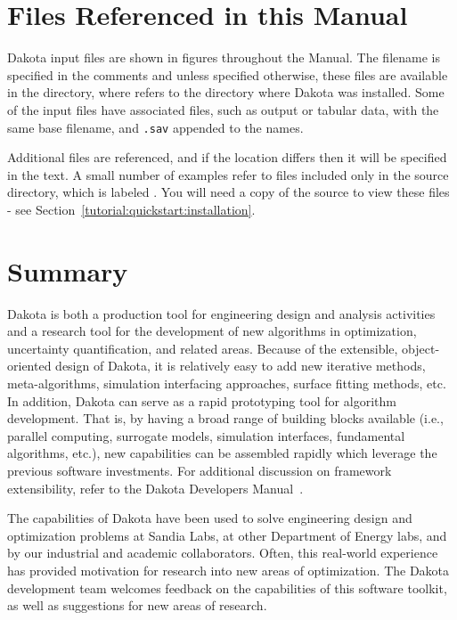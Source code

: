 \section{Files Referenced in this Manual}\label{intro:files}
Dakota input files are shown in figures throughout the Manual. 
The filename is specified in the comments
and unless specified otherwise, these
files are available in the  directory,
where  refers to the directory where Dakota was installed. Some
of the input files have associated files, such as output or tabular data,
with the same base filename, and {\tt .sav} appended to the names.

Additional files are referenced, and if the location differs then it will
be specified in the text.
A small number of examples refer to files included only in the source
directory, which is labeled . You will need a copy of
the source to view these files - see Section~\ref{tutorial:quickstart:installation}.

\section{Summary}\label{intro:summary}

Dakota is both a production tool for engineering design and analysis
activities and a research tool for the development of new algorithms
in optimization, uncertainty quantification, and related areas.
Because of the extensible, object-oriented design of Dakota, it is
relatively easy to add new iterative methods, meta-algorithms,
simulation interfacing approaches, surface fitting methods, etc. In
addition, Dakota can serve as a rapid prototyping tool for algorithm
development. That is, by having a broad range of building blocks
available (i.e., parallel computing, surrogate models, simulation
interfaces, fundamental algorithms, etc.), new capabilities can be
assembled rapidly which leverage the previous software investments.
For additional discussion on framework extensibility, refer to the
Dakota Developers Manual~\cite{DevMan}.

The capabilities of Dakota have been used to solve engineering design
and optimization problems at Sandia Labs, at other Department of
Energy labs, and by our industrial and academic collaborators. Often,
this real-world experience has provided motivation for research into
new areas of optimization. The Dakota development team welcomes
feedback on the capabilities of this software toolkit, as well as
suggestions for new areas of research.

